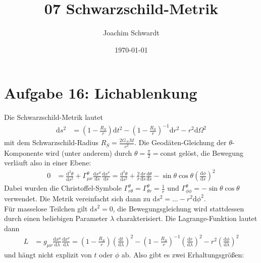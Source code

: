 \documentclass[a4paper,12pt]{article}
\newcommand{\kla}{}
\newcommand{\tecxt}{}
\begin{document}
\title{07 Schwarzschild-Metrik}
\author{Joachim Schwardt}
\date{\today}
\maketitle


\section*{Aufgabe 16: Lichablenkung}
Die Schwarzschild-Metrik lautet
\begin{align*}
\tecxt\text{d}s^2&=\kla\left( {1-\frac{R_S}{r}} \right)\tecxt\text{d}t^2-\kla\left( {1-\frac{R_S}{r}} \right)^{-1}\tecxt\text{d}r^2-r^2\tecxt\text{d}\Omega^2
\end{align*}
mit dem Schwarzschild-Radius $R_S=\frac{2G_NM}{c^2}$. Die Geodäten-Gleichung der $\theta$-Komponente wird (unter anderem) durch $\theta=\frac{\pi}{2}=\tecxt\text{const}$ gelöst, die Bewegung verläuft also in einer Ebene:
\begin{align*}
0&=\frac{\tecxt\text{d}^2\theta}{\tecxt\text{d}s^2}+\Gamma^\theta_{\mu\nu}\frac{\tecxt\text{d}x^\mu}{\tecxt\text{d}s}\frac{\tecxt\text{d}x^\nu}{\tecxt\text{d}s}=\frac{\tecxt\text{d}^2\theta}{\tecxt\text{d}s^2} + \frac{2}{r}\frac{\tecxt\text{d}r}{\tecxt\text{d}s}\frac{\tecxt\text{d}\theta}{\tecxt\text{d}s} - \sin\theta\cos\theta\kla\left( {\frac{\tecxt\text{d}\phi}{\tecxt\text{d}s}} \right)^2
\end{align*}
Dabei wurden die Christoffel-Symbole $\Gamma^\theta_{r\theta}=\Gamma^\theta_{\theta r}=\frac{1}{r}$ und $\Gamma^\theta_{\phi\phi}=-\sin\theta\cos\theta$ verwendet. Die Metrik vereinfacht sich dann zu $\tecxt\text{d}s^2=\dots -r^2\tecxt\text{d}\phi^2$.\\ 
Für masselose Teilchen gilt $\tecxt\text{d}s^2=0$, die Bewegungsgleichung wird stattdessen durch einen beliebigen Parameter $\lambda$ charakterisiert. Die Lagrange-Funktion lautet dann 
\begin{align*}
L&=g_{\mu\nu}\frac{\tecxt\text{d}x^\mu}{\tecxt\text{d}\lambda}\frac{\tecxt\text{d}x^\nu}{\tecxt\text{d}\lambda}=\kla\left( {1-\frac{R_S}{r}} \right)\kla\left( {\frac{\tecxt\text{d}t}{\tecxt\text{d}\lambda}} \right)^2-\kla\left( {1-\frac{R_S}{r}} \right)^{-1}\kla\left( {\frac{\tecxt\text{d}r}{\tecxt\text{d}\lambda}} \right)^2-r^2\kla\left( {\frac{\tecxt\text{d}\phi}{\tecxt\text{d}\lambda}} \right)^2
\end{align*}
und hängt nicht explizit von $t$ oder $\phi$ ab. Also gibt es zwei Erhaltungsgrößen:
\end{document}
